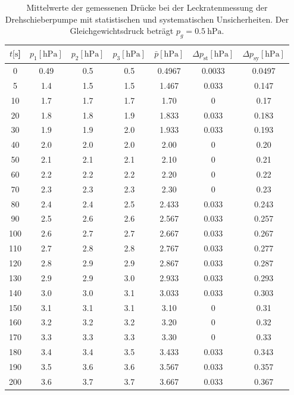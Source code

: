 \begin{table}[H]
  \centering
    \caption{Mittelwerte der gemessenen Drücke bei der Leckratenmessung der Drehschieberpumpe mit statistischen und systematischen Unsicherheiten. Der Gleichgewichtsdruck beträgt $p_g=\SI{0.5}{\hecto\pascal}$.}
    \label{tab:Dreh_Leck1}
    \begin{tabular}{
      S[table-format=3.0] 
      S[table-format=1.2] S[table-format=1.1] S[table-format=1.1]
      S[table-format=1.3] S[table-format=1.3] S[table-format=1.2]
      }
      \toprule
      {$t [\si{\second}$]} &
      {$p_1 [\si{\hecto\pascal}]$} & {$p_2 [\si{\hecto\pascal}]$} & {$p_3 [\si{\hecto\pascal}]$} &
      {$\bar{p} [\si{\hecto\pascal}]$} & {$\Delta p_\text{st} [\si{\hecto\pascal}]$} & {$\Delta p_\text{sy} [\si{\hecto\pascal}]$}\\
          & 0.49 & 0.5 & 0.5 & 0.4967 & 0.0033 & 0.0497\\
      5    & 1.4  & 1.5 & 1.5 & 1.467  & 0.033  & 0.147 \\
      10   & 1.7  & 1.7 & 1.7 & 1.70   & 0      & 0.17  \\
      20   & 1.8  & 1.8 & 1.9 & 1.833  & 0.033  & 0.183 \\
      30   & 1.9  & 1.9 & 2.0 & 1.933  & 0.033  & 0.193 \\
      40   & 2.0  & 2.0 & 2.0 & 2.00   & 0      & 0.20  \\
      50   & 2.1  & 2.1 & 2.1 & 2.10   & 0      & 0.21  \\
      60   & 2.2  & 2.2 & 2.2 & 2.20   & 0      & 0.22  \\
      70   & 2.3  & 2.3 & 2.3 & 2.30   & 0      & 0.23  \\
      80   & 2.4  & 2.4 & 2.5 & 2.433  & 0.033  & 0.243 \\
      90   & 2.5  & 2.6 & 2.6 & 2.567  & 0.033  & 0.257 \\
      100  & 2.6  & 2.7 & 2.7 & 2.667  & 0.033  & 0.267 \\
      110  & 2.7  & 2.8 & 2.8 & 2.767  & 0.033  & 0.277 \\
      120  & 2.8  & 2.9 & 2.9 & 2.867  & 0.033  & 0.287 \\
      130  & 2.9  & 2.9 & 3.0 & 2.933  & 0.033  & 0.293 \\
      140  & 3.0  & 3.0 & 3.1 & 3.033  & 0.033  & 0.303 \\
      150  & 3.1  & 3.1 & 3.1 & 3.10   & 0      & 0.31  \\
      160  & 3.2  & 3.2 & 3.2 & 3.20   & 0      & 0.32  \\
      170  & 3.3  & 3.3 & 3.3 & 3.30   & 0      & 0.33  \\
      180  & 3.4  & 3.4 & 3.5 & 3.433  & 0.033  & 0.343 \\
      190  & 3.5  & 3.6 & 3.6 & 3.567  & 0.033  & 0.357 \\
      200  & 3.6  & 3.7 & 3.7 & 3.667  & 0.033  & 0.367 \\
      \bottomrule
    \end{tabular}
\end{table}
